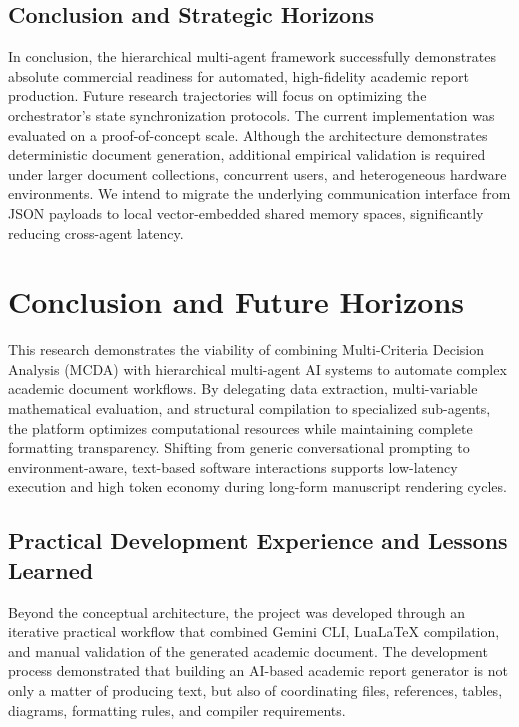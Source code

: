\subsection{Conclusion and Strategic Horizons}
In conclusion, the hierarchical multi-agent framework successfully demonstrates absolute commercial readiness for automated, high-fidelity academic report production. Future research trajectories will focus on optimizing the orchestrator's state synchronization protocols. The current implementation was evaluated on a proof-of-concept scale. Although the architecture demonstrates deterministic document generation, additional empirical validation is required under larger document collections, concurrent users, and heterogeneous hardware environments. We intend to migrate the underlying communication interface from JSON payloads to local vector-embedded shared memory spaces, significantly reducing cross-agent latency.


\section{Conclusion and Future Horizons}
This research demonstrates the viability of combining Multi-Criteria Decision Analysis (MCDA) with hierarchical multi-agent AI systems to automate complex academic document workflows. By delegating data extraction, multi-variable mathematical evaluation, and structural compilation to specialized sub-agents, the platform optimizes computational resources while maintaining complete formatting transparency. Shifting from generic conversational prompting to environment-aware, text-based software interactions supports low-latency execution and high token economy during long-form manuscript rendering cycles.

\subsection{Practical Development Experience and Lessons Learned}

Beyond the conceptual architecture, the project was developed through an iterative practical workflow that combined Gemini CLI, LuaLaTeX compilation, and manual validation of the generated academic document. The development process demonstrated that building an AI-based academic report generator is not only a matter of producing text, but also of coordinating files, references, tables, diagrams, formatting rules, and compiler requirements.

